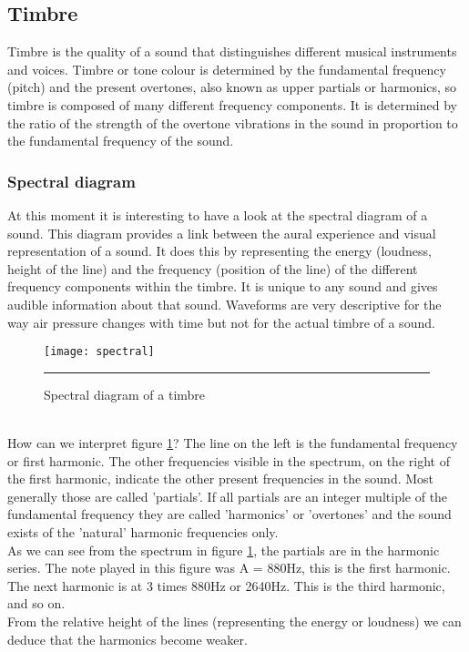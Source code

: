 \subsection{Timbre}
Timbre is the quality of a sound that distinguishes different musical instruments and voices. Timbre or tone colour is determined by the fundamental frequency (pitch) and the present overtones, also known as upper partials or harmonics, so timbre is composed of many different frequency components. It is determined by the ratio of the strength of the overtone vibrations in the sound in proportion to the fundamental frequency  of the sound.  

\subsubsection{Spectral diagram}
At this moment it is interesting to have a look at the spectral diagram of a sound. This diagram provides a link between the aural experience and visual representation of a sound. It does this by representing the energy (loudness, height of the line) and the frequency (position of the line) of the different frequency components within the timbre. It is unique to any sound and gives audible information about that sound. Waveforms are very descriptive for the way air pressure changes with time but not for the actual timbre of a sound.
\begin{figure}[htbp]
\centering
\texttt{[image: spectral]}
\rule{30em}{0.5pt}
\caption{Spectral diagram of a timbre}
\label{fig:spectral}
\end{figure} \\
How can we interpret figure \ref{fig:spectral}? The line on the left is the fundamental frequency or first harmonic. The other frequencies visible in the spectrum, on the right of the first harmonic, indicate the other present frequencies in the sound. Most generally those are called 'partials'. If all partials are an integer multiple of the fundamental frequency they are called 'harmonics' or 'overtones' and the sound exists of the 'natural' harmonic frequencies only. \\ As we can see from the spectrum in figure \ref{fig:spectral}, the partials are in the harmonic series. The note played in this figure was A = 880Hz, this is the first harmonic. The next harmonic is at 3 times 880Hz or 2640Hz. This is the third harmonic, and so on. \\  From the relative height of the lines (representing the energy or loudness) we can deduce that the harmonics become weaker.
